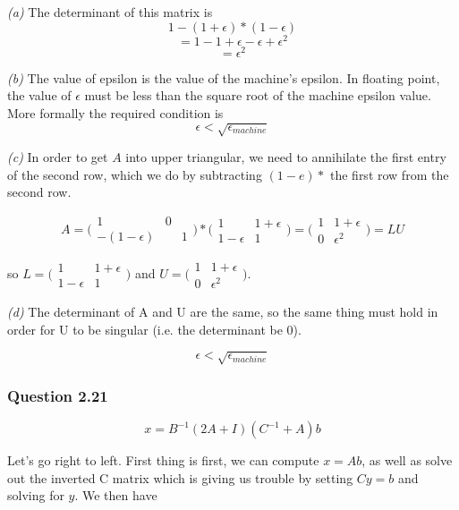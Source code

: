\documentclass{article}
\begin{document}
\textit{(a)}
The determinant of this matrix is
$$1 - (1 + \epsilon) * (1 - \epsilon)$$
$$= 1 - 1 + \epsilon - \epsilon + \epsilon^2$$
$$ = \epsilon^2$$

\textit{(b)}
The value of epsilon is the value of the machine's epsilon.
In floating point, the value of $\epsilon$ must be less than
the square root of the machine epsilon value. More formally the
required condition is
$$\epsilon < \sqrt{\epsilon_{machine}}$$

\textit{(c)}
In order to get $A$ into upper triangular, we need to annihilate the first
entry of the second row, which we do by subtracting $(1-e) *$ the first row
from the second row.

$$A = \bigl( \begin{smallmatrix}
		   1 & 0\\
    	   -(1 - \epsilon) && 1
           \end{smallmatrix} \bigr)
           * \bigl( \begin{smallmatrix} 
			  1 & 1 + \epsilon\\
  			  1 - \epsilon & 1 
			\end{smallmatrix} \bigr)
		= \bigl( \begin{smallmatrix} 
			  1 & 1 + \epsilon\\
  			  0 & \epsilon^2 
			\end{smallmatrix} \bigr) = LU$$
			
so $L =\bigl( \begin{smallmatrix} 
			  1 & 1 + \epsilon\\
  			  1 - \epsilon & 1 
			\end{smallmatrix} \bigr)$
and $U = \bigl( \begin{smallmatrix} 
			  1 & 1 + \epsilon\\
  			  0 & \epsilon^2 
			\end{smallmatrix} \bigr).$
			
\textit{(d)}
The determinant of A and U are the same, so the same thing must hold
in order for U to be singular (i.e. the determinant be 0).

$$\epsilon < \sqrt{\epsilon_{machine}}$$

\subsubsection{Question 2.21}
$$x = B^{-1} (2A + I)(C^{-1} + A)b$$

Let's go right to left. First thing is first, we can compute $x = Ab$, as well as
solve out the inverted C matrix which is giving us trouble by setting $Cy = b$ and
solving for $y$. We then have
\end{document}
